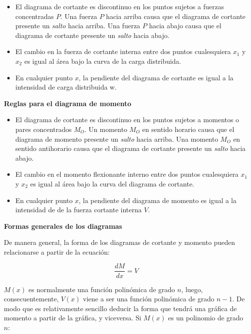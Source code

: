 \documentclass[12pt,letterpaper]{article}
\begin{document}
\begin{itemize}
\item El diagrama de cortante es discontinuo en los puntos sujetos a fuerzas concentradas $P$. 
Una fuerza $P$ hacia arriba causa que el diagrama de cortante presente un \textit{salto} hacia arriba. 
Una fuerza $P$ hacia abajo causa que el diagrama de cortante presente un \textit{salto} hacia abajo.

\item El cambio en la fuerza de cortante interna entre dos puntos cualesquiera $x_1$ y $x_2$ es 
igual al área bajo la curva de la carga distribuida.

\item En cualquier punto $x$, la pendiente del diagrama de cortante es igual a la intensidad de 
carga distribuida w.
\end{itemize}

\textbf{Reglas para el diagrama de momento}

\begin{itemize}
\item El diagrama de cortante es discontinuo en los puntos sujetos a momentos o pares concentrados $M_O$. 
Un momento $M_O$ en sentido horario causa que el diagrama de momento presente un \textit{salto} hacia arriba. 
Una momento $M_O$ en sentido antihorario causa que el diagrama de cortante presente un \textit{salto} hacia abajo.

\item El cambio en el momento flexionante interno entre dos puntos cualesquiera $x_1$ y $x_2$ es 
igual al área bajo la curva del diagrama de cortante.

\item En cualquier punto $x$, la pendiente del diagrama de momento es igual a la intensidad de 
de la fuerza cortante interna $V$.
\end{itemize}


\textbf{Formas generales de los diagramas}

De manera general, la forma de los diagramas de cortante y momento pueden relacionarse a 
partir de la ecuación:

$$ \frac{dM}{dx} = V $$

$M(x)$ es normalmente una función polinómica de grado $n$, luego, consecuentemente, 
$V(x)$ viene a ser una función polinómica de grado $n-1$. De modo que es relativamente 
sencillo deducir la forma que tendrá una gráfica de momento a partir de la gráfica, 
y viceversa. Si $M(x)$ es un polinomio de grado $n$:
\end{document}
